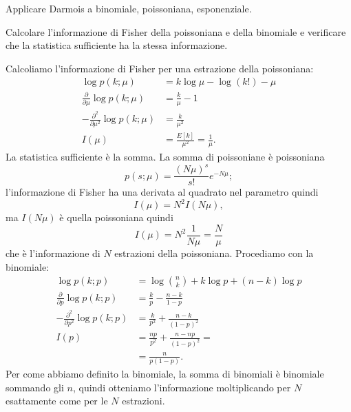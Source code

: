 \begin{exercise}
	Applicare Darmois a binomiale, poissoniana, esponenziale.
\end{exercise}

\begin{exercise}
	Calcolare l'informazione di Fisher della poissoniana e della binomiale e verificare che la statistica sufficiente ha la stessa informazione.
\end{exercise}

\begin{solution}
	Calcoliamo l'informazione di Fisher per una estrazione della poissoniana:
	\begin{align*}
		\log p(k;\mu)
		&= k\log\mu - \log(k!) - \mu \\
		\frac{\partial}{\partial\mu} \log p(k;\mu)
		&= \frac k\mu - 1 \\
		-\frac{\partial^2}{\partial\mu^2} \log p(k;\mu)
		&= \frac k{\mu^2} \\
		I(\mu)
		&= \frac{E[k]}{\mu^2}
		= \frac1\mu.
	\end{align*}
	La statistica sufficiente è la somma.
	La somma di poissoniane è poissoniana
	\begin{equation*}
		p(s;\mu)
		= \frac{(N\mu)^s}{s!}e^{-N\mu};
	\end{equation*}
	l'informazione di Fisher ha una derivata al quadrato nel parametro quindi
	\begin{equation*}
		I(\mu)
		= N^2 I(N\mu),
	\end{equation*}
	ma $I(N\mu)$ è quella poissoniana quindi
	\begin{equation*}
		I(\mu) = N^2 \frac1{N\mu} = \frac N\mu
	\end{equation*}
	che è l'informazione di $N$ estrazioni della poissoniana.
	Procediamo con la binomiale:
	\begin{align*}
		\log p(k;p)
		&= \log\binom nk + k\log p + (n-k)\log p \\
		\frac{\partial}{\partial p} \log p(k;p)
		&= \frac kp - \frac{n-k}{1-p} \\
		-\frac{\partial^2}{\partial p^2} \log p(k;p)
		&= \frac k{p^2} + \frac{n-k}{(1-p)^2} \\
		I(p)
		&= \frac{np}{p^2} + \frac{n-np}{(1-p)^2} = \\
		&= \frac n{p(1-p)}.
	\end{align*}
	Per come abbiamo definito la binomiale, la somma di binomiali è binomiale sommando gli $n$,
	quindi otteniamo l'informazione moltiplicando per $N$ esattamente come per le $N$ estrazioni.
\end{solution}

